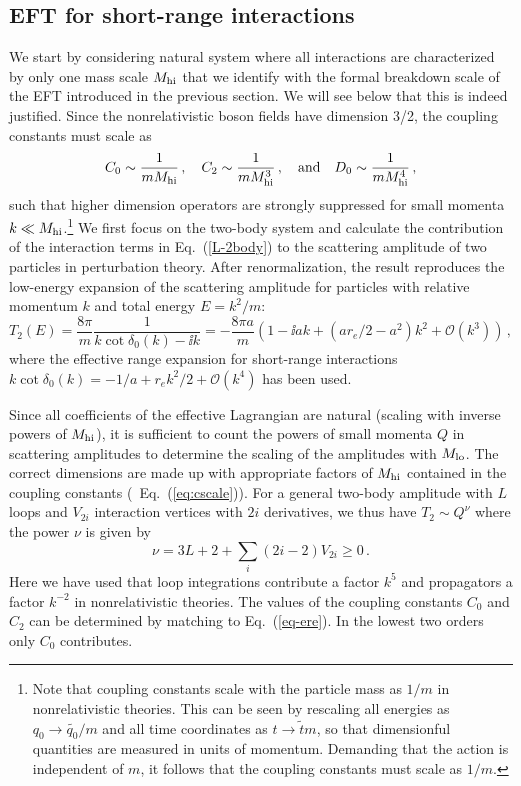 \subsection{EFT for short-range interactions}

We start by considering natural system where all interactions 
are characterized by only one mass scale $M_{\rm hi}$ that we identify with the 
formal breakdown scale of the EFT introduced in the previous section.  We will 
see below that this is indeed justified.  Since the nonrelativistic boson fields 
have dimension 3/2, the coupling constants must scale
as
\begin{equation}
 C_0 \sim \frac{1}{m\Mhi}\,,\quad C_2 \sim \frac{1}{m\Mhi^3}\,,
 \quad\text{and}\quad
 D_0 \sim \frac{1}{m\Mhi^4}\,,
\label{eq:cscale}
\end{equation}
such that higher dimension operators are strongly suppressed for small 
momenta $k \ll M_{\rm hi}$.\footnote{Note that coupling constants scale 
with the particle mass as 
$1/m$ in nonrelativistic theories. This can be seen by rescaling all 
energies as $q_0 \to \tilde{q_0}/m$ and all time coordinates as 
$t\to \tilde{t}m$, so that dimensionful quantities are measured in 
units of momentum. Demanding that the action is independent of $m$,
it follows that the coupling constants must scale as $1/m$.}
We first focus on the two-body system and
calculate the contribution of the interaction terms in Eq.~(\ref{L-2body}) 
to the scattering amplitude of two particles in perturbation theory. 
After renormalization, the result reproduces
the low-energy expansion of the 
scattering amplitude for particles with relative momentum $k$ and 
total energy $E=k^2/m$:
\begin{equation}
 T_2(E)=\frac{8\pi}{m}\frac{1}{k\cot\delta_0(k)-\ii k}=
 {-}\frac{8\pi a}{m}\left(1-\ii ak+ (ar_e/2-a^2)k^2 +{\mathcal O}(k^3)\right)\,,
\label{eq-ere}
\end{equation}
where the effective range expansion for short-range interactions
$k\cot\delta_0(k)={-}1/a+r_e k^2/2 +{\mathcal O}(k^4)$ has been used.

Since all coefficients of the effective Lagrangian are natural (scaling with 
inverse powers of $M_{\rm hi}$), it is sufficient to count the powers of small momenta 
$Q$ in scattering amplitudes to determine the scaling of the amplitudes with 
$M_{\rm lo}$. The correct dimensions are made up with appropriate factors of $M_{\rm hi}$ 
contained in the coupling constants (\cf~Eq.~(\ref{eq:cscale})).
For a general two-body amplitude with $L$ loops and $V_{2i}$ interaction
vertices with $2i$ derivatives, we thus have $T_2 \sim Q^\nu$ where the
power $\nu$ is given by
\begin{equation}
  \nu=3L+2+\sum_i (2i-2) V_{2i} \geq 0\,.
\label{nu-pert}
\end{equation}
Here we have used that loop integrations contribute a factor $k^5$
and propagators a factor $k^{-2}$ in nonrelativistic theories.
The values of the coupling constants $C_0$ and $C_2$ can be determined by 
matching to Eq.~(\ref{eq-ere}). In the lowest two orders only $C_0$ 
contributes.

